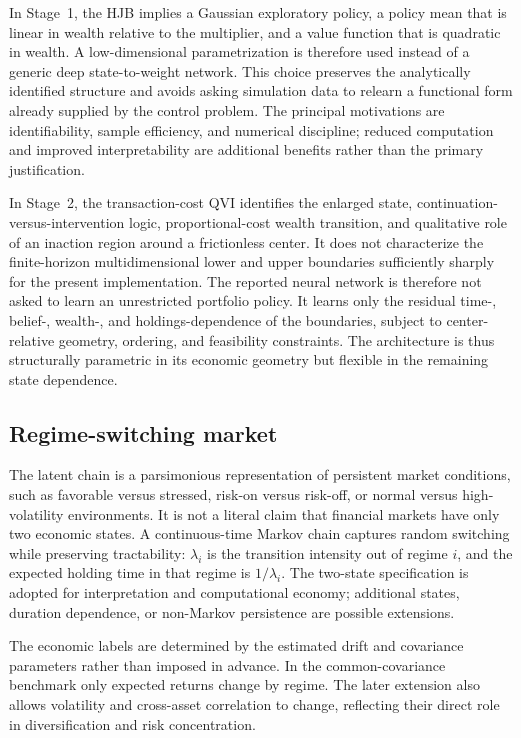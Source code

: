 \documentclass[a4paper,10pt]{article}
\begin{document}
In Stage~1, the HJB implies a Gaussian exploratory policy, a policy mean that is linear in wealth relative to the multiplier, and a value function that is quadratic in wealth. A low-dimensional parametrization is therefore used instead of a generic deep state-to-weight network. This choice preserves the analytically identified structure and avoids asking simulation data to relearn a functional form already supplied by the control problem. The principal motivations are identifiability, sample efficiency, and numerical discipline; reduced computation and improved interpretability are additional benefits rather than the primary justification.

In Stage~2, the transaction-cost QVI identifies the enlarged state, continuation-versus-intervention logic, proportional-cost wealth transition, and qualitative role of an inaction region around a frictionless center. It does not characterize the finite-horizon multidimensional lower and upper boundaries sufficiently sharply for the present implementation. The reported neural network is therefore not asked to learn an unrestricted portfolio policy. It learns only the residual time-, belief-, wealth-, and holdings-dependence of the boundaries, subject to center-relative geometry, ordering, and feasibility constraints. The architecture is thus structurally parametric in its economic geometry but flexible in the remaining state dependence.

\subsection{Regime-switching market}

The latent chain is a parsimonious representation of persistent market conditions, such as favorable versus stressed, risk-on versus risk-off, or normal versus high-volatility environments. It is not a literal claim that financial markets have only two economic states. A continuous-time Markov chain captures random switching while preserving tractability: $\lambda_i$ is the transition intensity out of regime $i$, and the expected holding time in that regime is $1/\lambda_i$. The two-state specification is adopted for interpretation and computational economy; additional states, duration dependence, or non-Markov persistence are possible extensions.

The economic labels are determined by the estimated drift and covariance parameters rather than imposed in advance. In the common-covariance benchmark only expected returns change by regime. The later extension also allows volatility and cross-asset correlation to change, reflecting their direct role in diversification and risk concentration.
\end{document}
